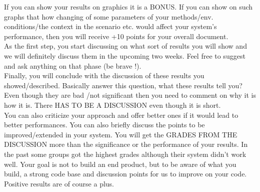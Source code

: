 \documentclass[journal]{IEEEtran}
\begin{document}
If you can show your results on graphics it is a BONUS. If you can show on such graphs that how changing of some parameters of your methods/env. conditions/the context in the scenario etc. would affect your system’s performance, then you will receive +10 points for your overall document. 
\\
As the first step, you start discussing on what sort of results you will show and we will definitely discuss them in the upcoming two weeks. Feel free to suggest and ask anything on that phase (be brave !).
\\
Finally, you will conclude with the discussion of these results you showed/described. Basically answer this question, what these results tell you? Even though they are bad /not significant then you need to comment on why it is how it is. There HAS TO BE A DISCUSSION even though it is short. 
\\
You can also criticize your approach and offer better ones if it would lead to better performances. You can also briefly discuss the points to be improved/extended in your system. You will get the GRADES FROM THE DISCUSSION more than the significance or the performance of your results. In the past some groups got the highest grades although their system didn’t work well. Your goal is not to build an end product, but to be aware of what you build, a strong code base and discussion points for us to improve on your code. Positive results are of course a plus.




%
%
\end{document}
